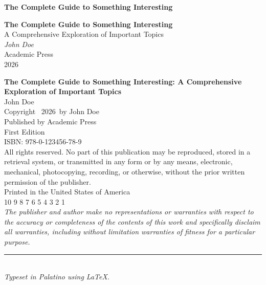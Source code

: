 \documentclass[11pt,twoside,openright]{book}
\title{\booktitle}
\author{\bookauthor}
\date{\bookyear}
\theoremstyle{plain}
\theoremstyle{definition}
\theoremstyle{remark}
\newcommand{\booktitle}{The Complete Guide to Something Interesting}
\newcommand{\booksubtitle}{A Comprehensive Exploration of Important Topics}
\newcommand{\bookauthor}{John Doe}
\newcommand{\bookpublisher}{Academic Press}
\newcommand{\bookyear}{2026}
\newcommand{\bookisbn}{978-0-123456-78-9}
\newcommand{\bookedition}{First Edition}
\begin{document}
\frontmatter

\thispagestyle{empty}
\begin{center}
    \vspace*{3in}
    {\Huge\bfseries \booktitle}
\end{center}
\cleardoublepage

\thispagestyle{empty}
\begin{center}
    \vspace*{1in}
    {\Huge\bfseries\color{chapterblue} \booktitle} \\[0.5cm]
    {\LARGE \booksubtitle} \\[2cm]
    {\Large\itshape \bookauthor} \\[3cm]
    {\large \bookpublisher} \\[0.3cm]
    {\large \bookyear}
\end{center}
\cleardoublepage

\thispagestyle{empty}
\vspace*{\fill}
\noindent
\textbf{\booktitle: \booksubtitle} \\
\bookauthor \\[1em]
Copyright \textcopyright\ \bookyear\ by \bookauthor \\[1em]
Published by \bookpublisher \\
\bookedition \\[1em]
ISBN: \bookisbn \\[2em]
All rights reserved. No part of this publication may be reproduced, stored in a retrieval system, or transmitted in any form or by any means, electronic, mechanical, photocopying, recording, or otherwise, without the prior written permission of the publisher. \\[2em]
Printed in the United States of America \\[1em]
10 9 8 7 6 5 4 3 2 1 \\[2em]
\textit{The publisher and author make no representations or warranties with respect to the accuracy or completeness of the contents of this work and specifically disclaim all warranties, including without limitation warranties of fitness for a particular purpose.}

\vspace{2em}
\noindent\rule{4cm}{0.4pt}\\[0.5em]
\noindent\small\textit{Typeset in Palatino using \LaTeX.}
\cleardoublepage
\end{document}
